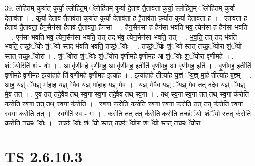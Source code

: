 \documentclass[17pt]{extarticle}
\begin{document}
39. लोहि॑तम् कुर्यात् कुर्या॒ ल्लोहि॑त॒म् ॅलोहि॑तम् कुर्या दे॒ताव॑ तै॒ताव॑ता कुर्या॒ ल्लोहि॑त॒म् ॅलोहि॑तम् कुर्या दे॒ताव॑ता । . कु॒र्या॒ दे॒ताव॑ तै॒ताव॑ता कुर्यात् कुर्या दे॒ताव॑ता ह है॒ताव॑ता कुर्यात् कुर्या दे॒ताव॑ता ह । . ए॒ताव॑ता ह है॒ताव॑ तै॒ताव॑ता॒ हैन॒सैन॑सा है॒ताव॑ तै॒ताव॑ता॒ हैन॑सा । . हैन॒सैन॑सा ह॒ हैन॑सा भवति भव॒ त्येन॑सा ह॒ हैन॑सा भवति । . एन॑सा भवति भव॒ त्येन॒सैन॑सा भवति॒ तत् तद् भ॑व॒ त्येन॒सैन॑सा भवति॒ तत् । . भ॒व॒ति॒ तत् तद् भ॑वति भवति॒ तच्छं॒ॅयोः शं॒ॅयो स्तद् भ॑वति भवति॒ तच्छं॒ॅयोः । . तच्छं॒ॅयोः शं॒ॅयो स्तत् तच्छं॒ॅयोरा शं॒ॅयो स्तत् तच्छं॒ॅयोरा । . शं॒ॅयोरा शं॒ॅयोः शं॒ॅयोरा वृ॑णीमहे वृणीमह॒ आ शं॒ॅयोः शं॒ॅयोरा वृ॑णीमहे । . शं॒ॅयोरिति॑ शं - योः । . आ वृ॑णीमहे वृणीमह॒ आ वृ॑णीमह॒ इतीति॑ वृणीमह॒ आ वृ॑णीमह॒ इति॑ । . वृ॒णी॒म॒ह॒ इतीति॑ वृणीमहे वृणीमह॒ इत्या॑हा॒हे ति॑ वृणीमहे वृणीमह॒ इत्या॑ह । . इत्या॑हा॒हे तीत्या॑ह य॒ज्ञ्ं ॅय॒ज्ञ् मा॒हे तीत्या॑ह य॒ज्ञ्म् । . आ॒ह॒ य॒ज्ञ्ं ॅय॒ज्ञ् मा॑हाह य॒ज्ञ् मे॒वैव य॒ज्ञ् मा॑हाह य॒ज्ञ् मे॒व । . य॒ज्ञ् मे॒वैव य॒ज्ञ्ं ॅय॒ज्ञ् मे॒व तत् तदे॒व य॒ज्ञ्ं ॅय॒ज्ञ् मे॒व तत् । . ए॒व तत् तदे॒वैव तथ् स्व॒गा स्व॒गा तदे॒वैव तथ् स्व॒गा । . तथ् स्व॒गा स्व॒गा तत् तथ् स्व॒गा क॑रोति करोति स्व॒गा तत् तथ् स्व॒गा क॑रोति । . स्व॒गा क॑रोति करोति स्व॒गा स्व॒गा क॑रोति॒ तत् तत् क॑रोति स्व॒गा स्व॒गा क॑रोति॒ तत् । . स्व॒गेति॑ स्व - गा । . क॒रो॒ति॒ तत् तत् क॑रोति करोति॒ तच्छं॒ॅयोः शं॒ॅयो स्तत् क॑रोति करोति॒ तच्छं॒ॅयोः । . तच्छं॒ॅयोः शं॒ॅयो स्तत् तच्छं॒ॅयोरा शं॒ॅयो स्तत् तच्छं॒ॅयोरा । \newline
\pagebreak
{}

\section{ TS 2.6.10.3 }
\end{document}
